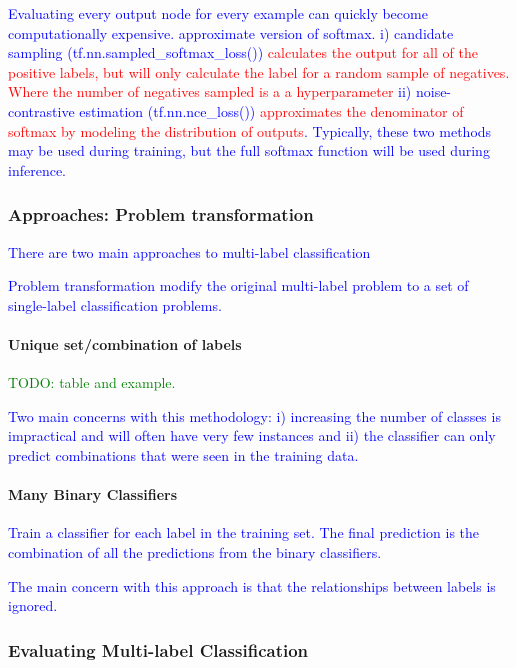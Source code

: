 \textcolor{blue}{Evaluating every output node for every example can quickly become computationally expensive. approximate version of softmax. i) candidate sampling (tf.nn.sampled\_softmax\_loss()) \textcolor{red}{calculates the output for all of the positive labels, but will only calculate the label for a random sample of negatives. Where the number of negatives sampled is a a hyperparameter} ii) noise-contrastive estimation (tf.nn.nce\_loss()) \textcolor{red}{approximates the denominator of softmax by modeling the distribution of outputs}. Typically, these two methods may be used during training, but the full softmax function will be used during inference.}


\subsubsection{Approaches: Problem transformation}

\textcolor{blue}{There are two main approaches to multi-label classification}

\textcolor{blue}{{Problem transformation} modify the original multi-label problem to a set of single-label classification problems.}

\paragraph{Unique set/combination of labels}

\textcolor{green}{TODO: table and example.}

\textcolor{blue}{Two main concerns with this methodology: i) increasing the number of classes is impractical and will often have very few instances and ii) the classifier can only predict combinations that were seen in the training data.}

\paragraph{Many Binary Classifiers}

\textcolor{blue}{Train a classifier for each label in the training set. The final prediction is the combination of all the predictions from the binary classifiers.}

\textcolor{blue}{The main concern with this approach is that the relationships between labels is ignored.}

\subsubsection{Evaluating Multi-label Classification}

